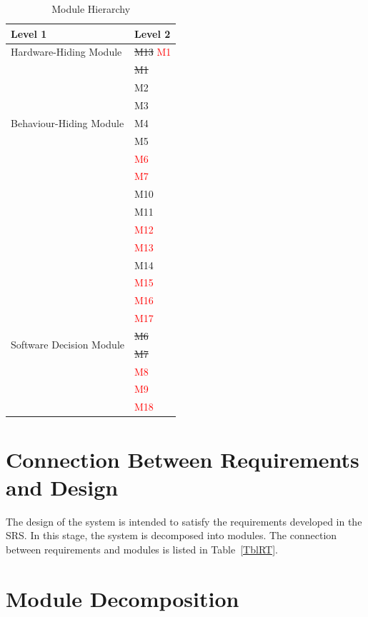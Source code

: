 \documentclass[12pt, titlepage]{article}
\begin{document}
\begin{table}[H]
\centering
\begin{tabular}{p{} p{}}
\toprule
\textbf{Level 1} & \textbf{Level 2}\\
\midrule

{Hardware-Hiding Module} & \sout{M13} \textcolor{red}{M1} \\
\midrule

\multirow{7}{0.3\textwidth}{Behaviour-Hiding Module}
& \sout{M1}\\
& M2\\
& M3\\
& M4\\
& M5\\
& \textcolor{red}{M6} \\
& \textcolor{red}{M7} \\
& M10\\
& M11\\
& \textcolor{red}{M12} \\
& \textcolor{red}{M13} \\
& M14\\
& \textcolor{red}{M15} \\
& \textcolor{red}{M16} \\
& \textcolor{red}{M17} \\
\midrule

\multirow{2}{0.3\textwidth}{Software Decision Module} 
& \sout{M6} \\  
& \sout{M7}\\
& \textcolor{red}{M8} \\
& \textcolor{red}{M9}\\
& \textcolor{red}{M18} \\
\bottomrule

\end{tabular}
\caption{Module Hierarchy}
\label{TblMH}
\end{table}

\section{Connection Between Requirements and Design} \label{SecConnection}

The design of the system is intended to satisfy the requirements developed in
the SRS. In this stage, the system is decomposed into modules. The connection
between requirements and modules is listed in Table~\ref{TblRT}.

\section{Module Decomposition} \label{SecMD}
\end{document}
